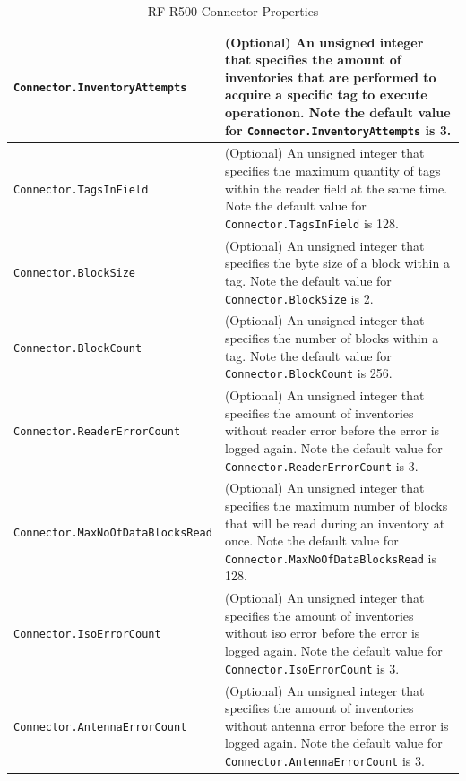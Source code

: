 \documentclass[11pt,a4paper,oneside]{article}
\newif\ifincludecc
\begin{document}
\begin{table}[!h]
\begin{tabular}{
|p{}%
|p{}|%
}
\fi
\hline
\texttt{Connector.InventoryAttempts}&(Optional) An unsigned integer that specifies the amount of inventories that are performed to acquire a specific tag to execute operation\ifincludecc , defined through CC, \fi on. Note the default value for \texttt{Connector.InventoryAttempts} is 3.\\
\hline
\texttt{Connector.TagsInField}&(Optional) An unsigned integer that specifies the maximum quantity of tags within the reader field at the same time. Note the default value for \texttt{Connector.TagsInField} is 128.\\
\hline
\texttt{Connector.BlockSize}&(Optional) An unsigned integer that specifies the byte size of a block within a tag. Note the default value for \texttt{Connector.BlockSize} is 2.\\
\hline
\texttt{Connector.BlockCount}&(Optional) An unsigned integer that specifies the number of blocks within a tag. Note the default value for \texttt{Connector.BlockCount} is 256.\\
\hline
\texttt{Connector.ReaderErrorCount}&(Optional) An unsigned integer that specifies the amount of inventories without reader error before the error is logged again. Note the default value for \texttt{Connector.ReaderErrorCount} is 3.\\
\hline
\texttt{Connector.MaxNoOfDataBlocks\newline Read}&(Optional) An unsigned integer that specifies the maximum number of blocks that will be read during an inventory at once. Note the default value for \texttt{Connector.MaxNoOfDataBlocksRead} is 128.\\
\hline
\texttt{Connector.IsoErrorCount}&(Optional) An unsigned integer that specifies the amount of inventories without iso error before the error is logged again. Note the default value for \texttt{Connector.IsoErrorCount} is 3.\\
\hline
\texttt{Connector.AntennaErrorCount}&(Optional) An unsigned integer that specifies the amount of inventories without antenna error before the error is logged again. Note the default value for \texttt{Connector.AntennaErrorCount} is 3.\\
\hline
\end {tabular}
\caption{RF-R500 Connector Properties}
\MakeLineNo
\end{table}
\FloatBarrier
\end{document}

